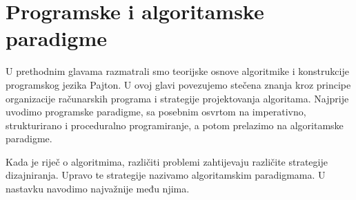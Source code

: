 \chapter{Programske i algoritamske paradigme}

U prethodnim glavama razmatrali smo teorijske osnove algoritmike i konstrukcije programskog jezika Pajton. U ovoj glavi povezujemo stečena znanja kroz principe organizacije računarskih programa i strategije projektovanja algoritama. Najprije uvodimo programske paradigme, sa posebnim osvrtom na imperativno, strukturirano i proceduralno programiranje, a potom prelazimo na algoritamske paradigme.

Kada je riječ o algoritmima, različiti problemi zahtijevaju različite strategije dizajniranja. Upravo te strategije nazivamo algoritamskim paradigmama. U nastavku navodimo najvažnije među njima.

